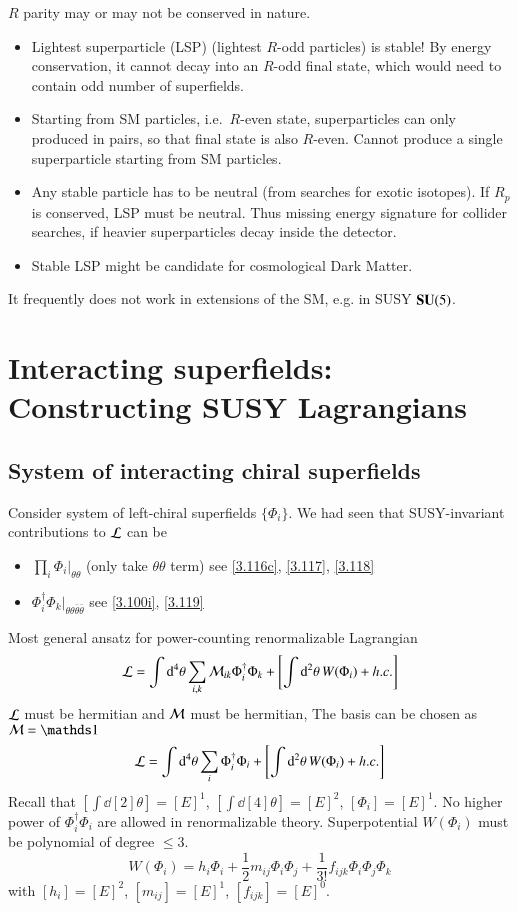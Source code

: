 $R$ parity may or may not be conserved in nature. 
\begin{itemize}
   \item Lightest superparticle (LSP) (lightest $R$-odd particles) is stable! By energy conservation, it cannot decay into an $R$-odd final state, which would need to contain odd number of superfields.
   \item Starting from SM particles, i.e.~$R$-even state, superparticles can only produced in pairs, so that final state is also $R$-even. Cannot produce a single superparticle starting from SM particles.
   \item Any stable particle has to be neutral (from searches for exotic isotopes). If $R_p$ is conserved, LSP must be neutral. Thus missing energy signature for collider searches, if heavier superparticles decay inside the detector.
   \item Stable LSP might be candidate for cosmological Dark Matter.
\end{itemize}
It frequently does not work in extensions of the SM, e.g. in SUSY $\mathbf{SU}(5)$.


\section{Interacting superfields: Constructing SUSY Lagrangians}
\subsection{System of interacting chiral superfields}
Consider system of left-chiral superfields $\{\Phi_i\}$. We had seen that SUSY-invariant contributions to $\mathcal{L}$ can be
\begin{itemize}
   \item $\prod_{i} \Phi_i |_{\theta\theta}$ (only take $\theta\theta$ term) see \eqref{3.116c}, \eqref{3.117}, \eqref{3.118}
   \item $\Phi_i^\dagger \Phi_k|_{\theta\theta\bar\theta\bar\theta}$ see \eqref{3.100i}, \eqref{3.119}
\end{itemize}
Most general ansatz for power-counting renormalizable Lagrangian
\begin{equation*}
   \mathcal{L} = \int \dd[4]{\theta} \sum_{i,k} \mathcal{M}_{ik} \Phi_i^\dagger \Phi_k + \left[ \int \dd[2]{\theta} W(\Phi_i) + h.c. \right]
\end{equation*}
$\mathcal{L}$ must be hermitian and $\mathcal{M}$ must be hermitian, The basis can be chosen as $\M = \id$
\begin{equation}
   \mathcal{L} = \int \dd[4]{\theta} \sum_i \Phi^\dagger_i \Phi_i + \left[ \int \dd[2]{\theta} W(\Phi_i) + h.c. \right] \label{3.141}
\end{equation}
Recall that $[\int \dd[2]{\theta}] = [E]^1$, $[\int \dd[4]{\theta} ] = [E]^2$, $[\Phi_i] = [E]^1$.
No higher power of $\Phi_i^\dagger \Phi_i $ are allowed in renormalizable theory. Superpotential $W(\Phi_i)$ must be polynomial of degree $\leq 3$.
\begin{equation}
   W(\Phi_i) = h_i \Phi_i + \frac{1}{2} m_{ij} \Phi_i \Phi_j + \frac{1}{3!} f_{ijk} \Phi_i \Phi_j \Phi_k \label{3.142}
\end{equation}
with $[h_i] = [E]^2$, $[m_{ij}] = [E]^{1}$, $[f_{ijk}]=[E]^0$.

